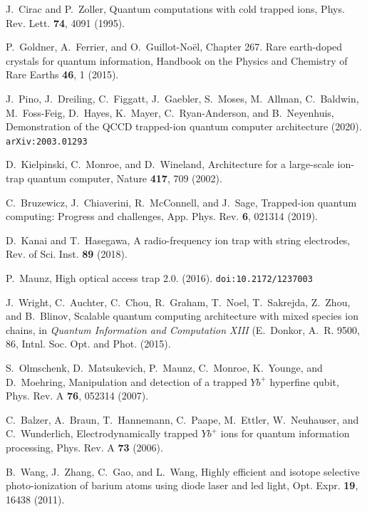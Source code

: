 \documentclass[12pt,a4paper]{amsart}
\numberwithin{equation}{section}
\theoremstyle{plain}
\theoremstyle{definition}
\begin{document}
\nocite{*}

\begin{thebibliography}{40}

J.~Cirac and P.~Zoller, Quantum computations with cold trapped ions, Phys. Rev. Lett. \textbf{74}, 4091 (1995).

P.~Goldner, A.~Ferrier, and O.~Guillot-No\"{e}l, Chapter 267. Rare earth-doped
  crystals for quantum information, Handbook on the Physics
  and Chemistry of Rare Earths \textbf{46}, 1 (2015).

J.~Pino, J.~Dreiling, C.~Figgatt, J.~Gaebler, S.~Moses, M.~Allman, C.~Baldwin,
  M.~Foss-Feig, D.~Hayes, K.~Mayer, C.~Ryan-Anderson, and B.~Neyenhuis,
  Demonstration of the QCCD trapped-ion quantum computer architecture
  (2020). \texttt{arXiv:2003.01293}

D.~Kielpinski, C.~Monroe, and D.~Wineland, Architecture for a large-scale
  ion-trap quantum computer, Nature \textbf{417}, 709 (2002).

C.~Bruzewicz, J.~Chiaverini, R.~McConnell, and J.~Sage, Trapped-ion quantum
  computing: Progress and challenges, App. Phys. Rev. \textbf{6}, 021314 (2019).

D.~Kanai and T.~Hasegawa, A radio-frequency ion trap with string
  electrodes, Rev. of Sci. Inst. \textbf{89} (2018).

P.~Maunz, High optical access trap 2.0. (2016). \texttt{doi:10.2172/1237003}

J.~Wright, C.~Auchter, C.~Chou, R.~Graham, T.~Noel, T.~Sakrejda, Z.~Zhou, and
  B.~Blinov, {Scalable quantum computing architecture with mixed species ion
  chains}, in {\em Quantum Information and Computation XIII} (E.~Donkor,
  A.~R. 9500, 86, Intnl.
  Soc. Opt. and Phot. (2015).

S.~Olmschenk, D.~Matsukevich, P.~Maunz, C.~Monroe, K.~Younge, and D.~Moehring,
  Manipulation and detection of a trapped $Yb^+$ hyperfine qubit, Phys.
  Rev. A \textbf{76}, 052314 (2007).

C.~Balzer, A.~Braun, T.~Hannemann, C.~Paape, M.~Ettler, W.~Neuhauser, and
  C.~Wunderlich, Electrodynamically trapped $Yb^+$ ions for quantum information processing, Phys. Rev. A
  \textbf{73} (2006).

B.~Wang, J.~Zhang, C.~Gao, and L.~Wang, Highly efficient and isotope selective photo-ionization of barium atoms using diode laser and led light, Opt. Expr. \textbf{19}, 16438 (2011).


\end{thebibliography}
\end{document}
